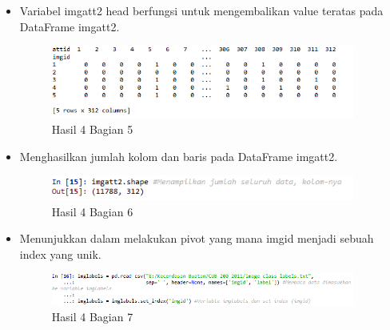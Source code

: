 \begin{itemize}
\item Variabel imgatt2 head berfungsi untuk mengembalikan value teratas pada DataFrame imgatt2.

\begin{figure}[H]
\centerline{\includegraphics[width=10cm]{figures/1174077/3/12.png}}
\caption{Hasil 4 Bagian 5}
\label{labelgambar}
\end{figure}

\item Menghasilkan jumlah kolom dan baris pada DataFrame imgatt2.

\begin{figure}[H]
\centerline{\includegraphics[width=10cm]{figures/1174077/3/13.png}}
\caption{Hasil 4 Bagian 6}
\label{labelgambar}
\end{figure}

\item Menunjukkan dalam melakukan pivot yang mana imgid menjadi sebuah index yang unik.

\begin{figure}[H]
\centerline{\includegraphics[width=10cm]{figures/1174077/3/14.png}}
\caption{Hasil 4 Bagian 7}
\label{labelgambar}
\end{figure}


\end{itemize}
